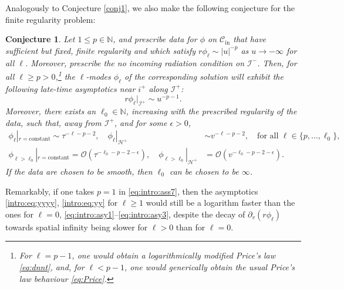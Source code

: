 \documentclass[11pt,english]{article}
\numberwithin{equation}{section}
\newtheorem{conj}{Conjecture}
\theoremstyle{remark}
\theoremstyle{plain}
\theoremstyle{remark}
\newcommand{\pv}{\partial_v}
\renewcommand{\(}{\left(}
\renewcommand{\)}{\right)}
\begin{document}
Analogously to Conjecture \ref{conj1}, we also make the following conjecture for the finite regularity problem:
\begin{conj}\label{conj2}
Let $1\leq p \in \mathbb N$, and prescribe  data for $\phi$ on $\mathcal C_{\mathrm{in}}$ that have sufficient but fixed, finite regularity and which satisfy $r\phi_\ell\sim |u|^{-p}$ as $u\to-\infty$ for all $\ell$.
 Moreover, prescribe the no incoming radiation condition on $\mathcal I^-$. 
 Then, for all $\ell\geq p>0$,\footnote{For $\ell=p-1$, one would obtain a logarithmically modified Price's law \eqref{eq:dnnt}, and, for $\ell<p-1$, one would \textit{generically} obtain the usual Price's law behaviour \eqref{eq:Price}. } the $\ell$-modes $\phi_\ell$ of the corresponding solution will exhibit the following late-time asymptotics near $i^+$ along $\mathcal I^+$:
 \begin{equation}\label{intro:eq:yyyy}
 r\phi_\ell|_{\mathcal I^+}\sim u^{-p-1}.
 \end{equation}
 Moreover, there exists an $\ell_0\in \mathbb N$, increasing with the prescribed regularity of the data, such that, away from $\mathcal I^+$, and for some $\epsilon>0$,
\begin{align}\label{intro:eq:yy}
\phi_\ell|_{r=\text{constant}}\sim \tau^{-\ell-p-2},\quad \phi_\ell|_{\mathcal{H}^+}&\sim v^{-\ell-p-2},\quad\text{for all } \ell\in\{p,\dots,\ell_0\},\\
\phi_{\ell>\ell_0}|_{r=\text{constant}}=\mathcal O( \tau^{-\ell_0-p-2-\epsilon}),\quad \phi_{\ell>\ell_0}|_{\mathcal{H}^+}&=\mathcal O( v^{-\ell_0-p-2-\epsilon}).
\end{align}
 If the data are chosen to be smooth, then $\ell_0$ can be chosen to be $\infty$.
\end{conj}
 Remarkably, if one takes $p=1$ in \eqref{eq:intro:ass7}, then the asymptotics \eqref{intro:eq:yyyy}, \eqref{intro:eq:yy} for $\ell\geq 1$ would still be a logarithm faster than the ones for $\ell=0$, \eqref{eq:intro:asy1}--\eqref{eq:intro:asy3}, despite the decay of $\pv(r\phi_\ell)$ towards spatial infinity being slower for $\ell>0$ than for $\ell=0$.
\end{document}
